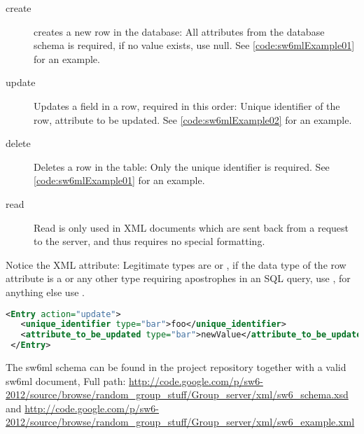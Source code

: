 \begin{description}
 \item[create] creates a new row in the database: All attributes from the database schema is required, if no value exists, use null. See \autoref{code:sw6mlExample01} for an example.
 \item[update] Updates a field in a row, required in this order: Unique identifier of the row, attribute to be updated. See \autoref{code:sw6mlExample02} for an example.
 \item[delete] Deletes a row in the table: Only the unique identifier is required. See \autoref{code:sw6mlExample01} for an example.
 \item[read]   Read is only used in XML documents which are sent back from a request to the server, and thus requires no special formatting.
\end{description}

Notice the  XML attribute: Legitimate types are  or , if the data type of the row attribute is a  or any other type requiring apostrophes
in an SQL query, use , for anything else use .

\begin{Code}
\begin{lstlisting}[label=code:sw6mlExample02,language=XML,caption=sw6ml update syntax example]
 <Entry action="update">
   <unique_identifier type="bar">foo</unique_identifier>
   <attribute_to_be_updated type="bar">newValue</attribute_to_be_updated>
 </Entry>
\end{lstlisting}
\end{Code}

The sw6ml schema can be found in the project repository together with a valid sw6ml document,
Full path: \url{http://code.google.com/p/sw6-2012/source/browse/random_group_stuff/Group_server/xml/sw6_schema.xsd}
and \url{http://code.google.com/p/sw6-2012/source/browse/random_group_stuff/Group_server/xml/sw6_example.xml} %
